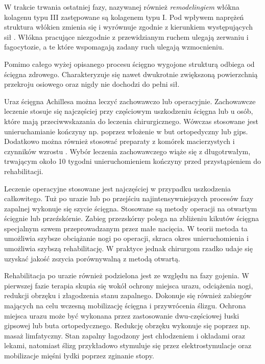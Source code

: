 W trakcie trwania ostatniej fazy, nazywanej również \textit{remodelingiem} włókna kolagenu typu III zastępowane są kolagenem typu I. Pod wpływem naprężeń struktura włókien zmienia się i wyrównuje zgodnie z kierunkiem występujących sił \cite{Yang2013}. Włókna pracujące niezgodnie z przewidzianym ruchem ulegają zerwaniu i fagocytozie, a te które wspomagają zadany ruch ulegają wzmocnieniu. 

Pomimo całego wyżej opisanego procesu ścięgno wygojone strukturą odbiega od ścięgna zdrowego. Charakteryzuje się nawet dwukrotnie zwiększoną powierzchnią przekroju osiowego oraz nigdy nie dochodzi do pełni sił. 

Uraz ścięgna Achillesa można leczyć zachowawczo lub operacyjnie. Zachowawcze leczenie stosuje się najczęściej przy częściowym uszkodzeniu ścięgna lub u osób, które mają przeciwwskazania do leczenia chirurgicznego. Wówczas stosowane jest unieruchamianie kończyny np. poprzez włożenie w but ortopedyczny lub gips. Dodatkowo można również stosować preparaty z komórek macierzystych i czynników wzrostu \cite{CMC}. Wybór leczenia zachowawczego wiąże się z długotrwałym, trwającym około 10 tygodni unieruchomieniem kończyny przed przystąpieniem do rehabilitacji.

Leczenie operacyjne stosowane jest najczęściej w przypadku uszkodzenia całkowitego. Tuż po urazie lub po przejściu najintensywniejszych procesów fazy zapalnej wykonuje się szycie ścięgna. Stosowane są metody operacji na otwartym ścięgnie lub przeźskórnie. Zabieg przezskórny polega na zbliżeniu kikutów ścięgna specjalnym szwem przeprowadzanym przez małe nacięcia. W teorii metoda ta umożliwia szybsze obciążanie nogi po operacji, skraca okres unieruchomienia i umożliwia szybszą rehabilitację. W praktyce jednak chirurgom rzadko udaje się uzyskać jakość zszycia porównywalną z metodą otwartą. 

Rehabilitacja po urazie również podzielona jest ze względu na fazy gojenia. W pierwszej fazie terapia skupia się wokół ochrony miejsca urazu, odciążenia nogi, redukcji obrzęku i złagodzenia stanu zapalnego. Dokonuje się również zabiegów mających na celu wczesną mobilizację ścięgna i przywrócenia ślizgu. Ochrona miejsca urazu może być wykonana przez zastosowanie dwu-częściowej łuski gipsowej lub buta ortopedycznego. Redukcję obrzęku wykonuje się poprzez np. masaż limfatyczny. Stan zapalny łagodzony jest chłodzeniem i okładami oraz lekami, natomiast ślizg przykładowo stymuluje się przez elektrostymulacje oraz mobilizacje mięśni łydki poprzez zginanie stopy.

